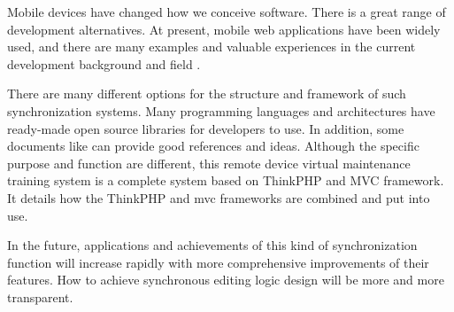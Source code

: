 \vspace{0.3cm}
\noindent Mobile devices have changed how we conceive software. There is a great range of development alternatives. At present, mobile web applications have been widely used, and there are many examples and valuable experiences in the current development background and field \citep{7128878}.
 
\vspace{0.3cm}
\noindent There are many different options for the structure and framework of such synchronization systems. Many programming languages and architectures have ready-made open source libraries for developers to use. In addition, some documents like \citep{hao2017} can provide good references and ideas. Although the specific purpose and function are different, this remote device virtual maintenance training system is a complete system based on ThinkPHP and MVC framework. It details how the ThinkPHP and mvc frameworks are combined and put into use.

\vspace{0.3cm}
\noindent In the future, applications and achievements of this kind of synchronization function will increase rapidly with more comprehensive improvements of their features. How to achieve synchronous editing logic design will be more and more transparent. 






